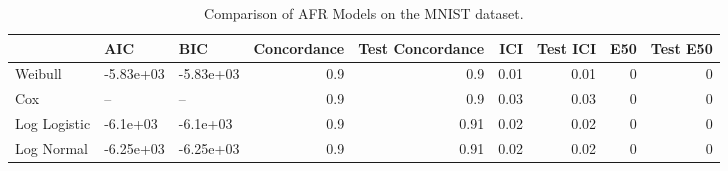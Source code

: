 \begin{table*}
\centering
\caption{Comparison of AFR Models on the MNIST dataset.}
\label{tab:mnist}
\begin{tabular}{lllrrrrrr}
\toprule
 & AIC & BIC & Concordance & Test Concordance & ICI & Test ICI & E50 & Test E50 \\
\midrule
Weibull & -5.83e+03 & -5.83e+03 & 0.9 & 0.9 & 0.01 & 0.01 & 0 & 0 \\
Cox & -- & -- & 0.9 & 0.9 & 0.03 & 0.03 & 0 & 0 \\
Log Logistic & -6.1e+03 & -6.1e+03 & 0.9 & 0.91 & 0.02 & 0.02 & 0 & 0 \\
Log Normal & -6.25e+03 & -6.25e+03 & 0.9 & 0.91 & 0.02 & 0.02 & 0 & 0 \\
\bottomrule
\end{tabular}
\end{table*}
